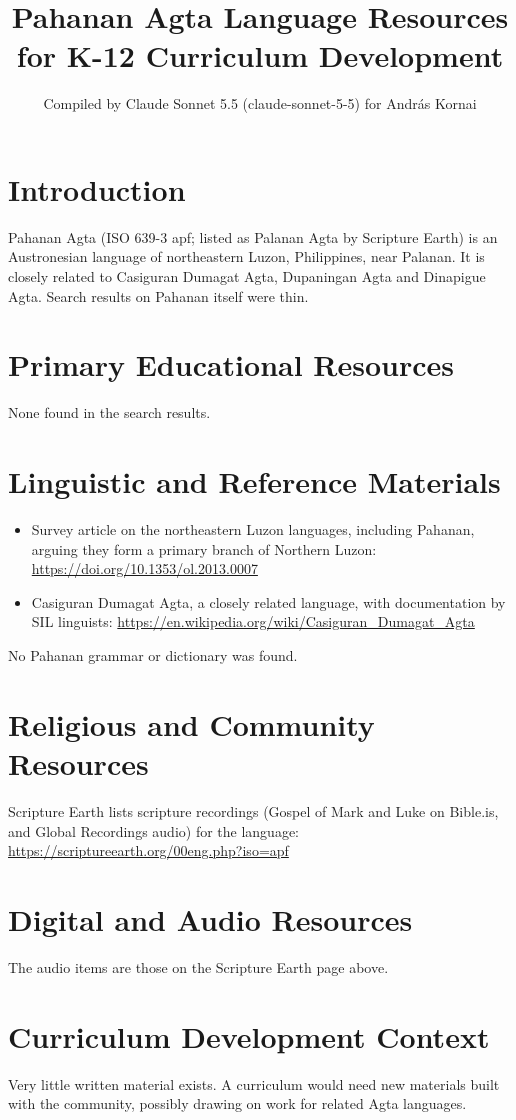 \documentclass[12pt]{article}
\title{Pahanan Agta Language Resources for K-12 Curriculum Development}
\author{Compiled by Claude Sonnet 5.5 (claude-sonnet-5-5) for Andr\'as Kornai}
\date{}
\begin{document}
\maketitle

\section{Introduction}
Pahanan Agta (ISO 639-3 apf; listed as Palanan Agta by Scripture Earth) is an Austronesian language of northeastern Luzon, Philippines, near Palanan. It is closely related to Casiguran Dumagat Agta, Dupaningan Agta and Dinapigue Agta. Search results on Pahanan itself were thin.

\section{Primary Educational Resources}
None found in the search results.

\section{Linguistic and Reference Materials}
\begin{itemize}
\item Survey article on the northeastern Luzon languages, including Pahanan, arguing they form a primary branch of Northern Luzon: \url{https://doi.org/10.1353/ol.2013.0007}
\item Casiguran Dumagat Agta, a closely related language, with documentation by SIL linguists: \url{https://en.wikipedia.org/wiki/Casiguran_Dumagat_Agta}
\end{itemize}
No Pahanan grammar or dictionary was found.

\section{Religious and Community Resources}
Scripture Earth lists scripture recordings (Gospel of Mark and Luke on Bible.is, and Global Recordings audio) for the language: \url{https://scriptureearth.org/00eng.php?iso=apf}

\section{Digital and Audio Resources}
The audio items are those on the Scripture Earth page above.

\section{Curriculum Development Context}
Very little written material exists. A curriculum would need new materials built with the community, possibly drawing on work for related Agta languages.
\end{document}
